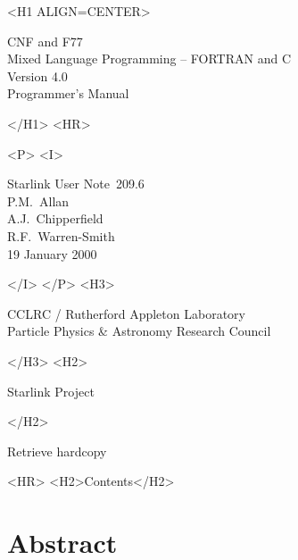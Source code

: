\documentclass[twoside,11pt]{article}
\newcommand{\stardoccategory}  {Starlink User Note}
\newcommand{\stardocsource}    {sun\stardocnumber}
\newcommand{\stardocnumber}    {209.6}
\newcommand{\stardocauthors}   {P.M.\ Allan\\
                                A.J.\ Chipperfield\\
                                R.F.\ Warren-Smith}
\newcommand{\stardocdate}      {19 January 2000}
\newcommand{\stardoctitle}     {CNF and F77 \\ [1ex]
                                Mixed Language Programming -- FORTRAN and C}
\newcommand{\stardocversion}   {Version 4.0}
\newcommand{\stardocmanual}    {Programmer's Manual}
\newcommand{\htmladdnormallink}[2]{#1}
\newcommand{\htmladdimg}[1]{}
\newcommand{\htmlref}[2]{#1}
\newcommand{\htmladdtonavigation}[1]{}
\newcommand{\xlabel}[1]{}
\renewcommand{\_}{\texttt{\symbol{95}}}
\begin{document}
\begin{htmlonly}
   \xlabel{}
   \begin{rawhtml} <H1 ALIGN=CENTER> \end{rawhtml}
      \stardoctitle\\
      \stardocversion\\
      \stardocmanual
   \begin{rawhtml} </H1> <HR> \end{rawhtml}


   \begin{rawhtml} <P> <I> \end{rawhtml}
   \stardoccategory\ \stardocnumber \\
   \stardocauthors \\
   \stardocdate
   \begin{rawhtml} </I> </P> <H3> \end{rawhtml}
      \htmladdnormallink{CCLRC}{http://www.cclrc.ac.uk} /
      \htmladdnormallink{Rutherford Appleton Laboratory}
                        {http://www.cclrc.ac.uk/ral} \\
      \htmladdnormallink{Particle Physics \& Astronomy Research Council}
                        {http://www.pparc.ac.uk} \\
   \begin{rawhtml} </H3> <H2> \end{rawhtml}
      \htmladdnormallink{Starlink Project}{http://www.starlink.rl.ac.uk/}
   \begin{rawhtml} </H2> \end{rawhtml}
   \htmladdnormallink{\htmladdimg{source.gif} Retrieve hardcopy}
      {http://www.starlink.rl.ac.uk/cgi-bin/hcserver?\stardocsource}\\

  \label{stardoccontents}
  \begin{rawhtml} 
    <HR>
    <H2>Contents</H2>
  \end{rawhtml}
  \htmladdtonavigation{\htmlref{\htmladdimg{contents_motif.gif}}
        {stardoccontents}}

  \section{\xlabel{abstract}Abstract}
\end{htmlonly}
\end{document}
